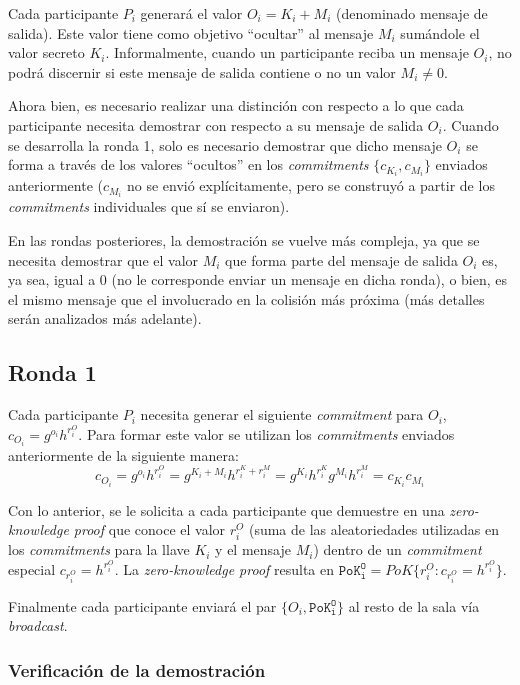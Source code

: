 Cada participante $P_i$ generará el valor $O_i = K_i + M_i$ (denominado mensaje de salida). 
Este valor tiene como objetivo ``ocultar'' al mensaje $M_i$ sumándole el valor 
secreto $K_i$. Informalmente, cuando un participante reciba un mensaje $O_i$, no podrá 
discernir si este mensaje de salida contiene o no un valor $M_i \neq 0$.

Ahora bien, es necesario realizar una distinción con respecto a lo que cada participante 
necesita demostrar con respecto a su mensaje de salida $O_i$. Cuando se desarrolla la 
ronda 1, solo es necesario demostrar que dicho mensaje $O_i$ se forma a través de los 
valores ``ocultos'' en los \emph{commitments} $\{c_{K_i}, c_{M_i}\}$ enviados anteriormente 
($c_{M_i}$ no se envió explícitamente, pero se construyó a partir de los \emph{commitments} 
individuales que sí se enviaron).

En las rondas posteriores, la demostración se vuelve más compleja, ya que se necesita 
demostrar que el valor $M_i$ que forma parte del mensaje de salida $O_i$ es, ya sea, igual 
a 0 (no le corresponde enviar un mensaje en dicha ronda), o bien, es el mismo mensaje que 
el involucrado en la colisión más próxima (más detalles serán analizados más adelante).

\subsection{Ronda 1}

Cada participante $P_i$ necesita generar el siguiente \emph{commitment} para 
$O_i$, $c_{O_i} = g^{o_i} h^{r_i^O}$. Para formar este valor se utilizan los \emph{commitments} 
enviados anteriormente de la siguiente manera: 
$$c_{O_i} = g^{o_i} h^{r_i^O} = g^{K_i + M_i} h^{r_i^K + r_i^M} = g^{K_i} h^{r_i^K} g^{M_i} h^{r_i^M} = c_{K_i} c_{M_i}$$

Con lo anterior, se le solicita a cada participante que demuestre en una \emph{zero-knowledge proof} 
que conoce el valor $r_i^O$ (suma de las aleatoriedades utilizadas en los 
\emph{commitments} para la llave $K_i$ y el mensaje $M_i$) dentro de un \emph{commitment} 
especial $c_{r_i^O} = h^{r_i^O}$. La \emph{zero-knowledge proof} resulta en 
$\mathtt{PoK_i^O} = PoK\{r_i^O : c_{r_i^O} = h^{r_i^O}\}$.

Finalmente cada participante enviará el par $\{O_i, \mathtt{PoK_i^O}\}$ al resto de 
la sala vía \emph{broadcast}.

\subsubsection{Verificación de la demostración}

